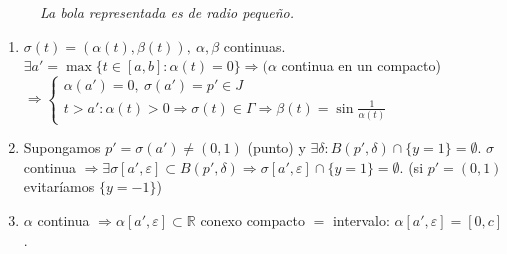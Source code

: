 \begin{ej}
\begin{enumerate}
\begin{demo}
\begin{figure}[H]
            \caption{\textit{La bola representada es de radio pequeño.}}
            \label{fig:seno_topologo_caminos}
        \end{figure}

        \begin{enumerate}
            \item $\sigma\left( t \right) = \left( \alpha\left( t \right), \beta\left( t \right) \right),\ \alpha, \beta$ continuas. $\exists a' = \max \{t \in \left[ a, b \right] : \alpha\left( t \right) = 0\} \Rightarrow (\alpha$ continua en un compacto) %
            $\Rightarrow \begin{cases}
                \alpha\left( a' \right) = 0,\ \sigma\left( a' \right) = p' \in J\\
                t > a': \alpha\left( t \right) > 0 \Rightarrow \sigma\left( t \right) \in \Gamma \Rightarrow \beta\left( t \right) = \sin \frac{1}{\alpha\left( t \right)} 
            \end{cases} $

            \item Supongamos $p' = \sigma\left( a' \right) \neq \left( 0, 1 \right)$ (punto) y $\exists \delta: B\left( p', \delta \right) \cap \{y = 1\} = \emptyset$. $\sigma$ continua $\Rightarrow \exists \sigma\left[ a', \varepsilon \right] \subset B\left( p', \delta \right) \Rightarrow \sigma\left[ a', \varepsilon \right] \cap \{y = 1\} = \emptyset$. (si $p' = \left( 0, 1 \right)$ evitaríamos $\{y = -1\}$)

            \item $\alpha$ continua $\Rightarrow \alpha\left[ a', \varepsilon \right] \subset \mathbb{R}$ conexo compacto $=$ intervalo: $\alpha\left[ a', \varepsilon \right] = \left[ 0, c \right]$.


\end{enumerate}
\end{demo}
\end{enumerate}
\end{ej}
